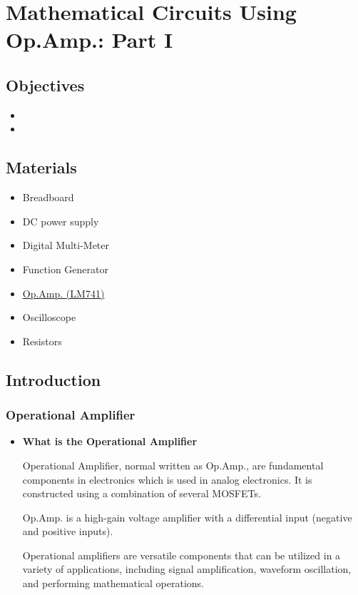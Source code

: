 \chapter{Mathematical Circuits Using Op.Amp.: Part I}


\section{Objectives}
\begin{itemize}
    \item 
    \item 
\end{itemize}

\section{Materials}
\begin{itemize}
    \item Breadboard
    \item DC power supply
    \item Digital Multi-Meter
    \item Function Generator
    \item \hyperref[LM741_1]{Op.Amp. (LM741)}
    \item Oscilloscope
    \item Resistors
\end{itemize}

\section{Introduction}
    \subsection{Operational Amplifier}
        \begin{itemize}
            \item \textbf{What is the Operational Amplifier}\par
                Operational Amplifier, normal written as Op.Amp., are fundamental components in electronics which is used in analog electronics. It is constructed using a combination of several MOSFETs.\par
                Op.Amp. is a high-gain voltage amplifier with a differential input (negative and positive inputs).\par
                Operational amplifiers are versatile components that can be utilized in a variety of applications, including signal amplification, waveform oscillation, and performing mathematical operations.
        \end{itemize}
